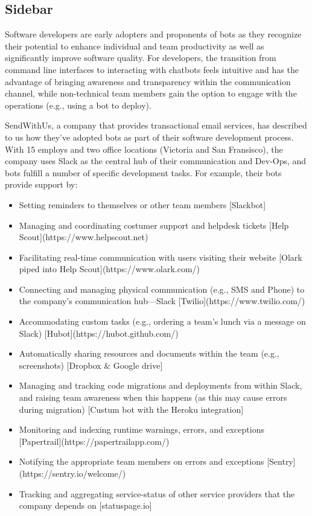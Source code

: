 \documentclass{sig-alternate}
\begin{document}
\begin{mdframed}
\section*{Sidebar}

Software developers are early adopters and proponents of bots as they recognize their potential to enhance individual and team productivity as well as significantly improve software quality. For developers, the transition from command line interfaces to interacting with chatbots feels intuitive and has the advantage of bringing awareness and transparency within the communication channel, while non-technical team members gain the option to engage with the operations (e.g., using a bot to deploy).

SendWithUs, a company that provides transactional email services, has described to us how they've adopted bots as part of their software development process. With 15 employs and two office locations (Victoria and San Fransisco), the company uses Slack as the central hub of their communication and Dev-Ops, and bots fulfill a number of specific development tasks. For example, their bots provide support by:

\begin{itemize} 
\item Setting reminders to themselves or other team members [Slackbot]
\item Managing and coordinating costumer support and helpdesk tickets [Help Scout](https://www.helpscout.net)
\item Facilitating real-time communication with users visiting their website [Olark piped into Help Scout](https://www.olark.com/)
\item Connecting and managing physical communication (e.g., SMS and Phone) to the company's communication hub---Slack [Twilio](https://www.twilio.com/)
\item Accommodating custom tasks (e.g., ordering a team's lunch via a message on Slack) [Hubot](https://hubot.github.com/)
\item Automatically sharing resources and documents within the team (e.g., screenshots) [Dropbox \& Google drive]
\item Managing and tracking code migrations and deployments from within Slack, and raising team awareness when this happens (as this may cause errors during migration) [Custum bot with the Heroku integration]
\item Monitoring and indexing runtime warnings, errors, and exceptions [Papertrail](https://papertrailapp.com/)
\item Notifying the appropriate team members on errors and exceptions [Sentry](https://sentry.io/welcome/)
\item Tracking and aggregating service-status of other service providers that the company depends on [statuspage.io]
\end{itemize}


\end{mdframed}
\end{document}
